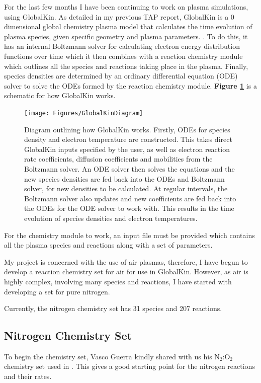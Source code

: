 \documentclass[11pt, oneside]{article}   	%
\begin{document}
For the last few months I have been continuing to work on plasma simulations, using GlobalKin.
As detailed in my previous TAP report, GlobalKin is a 0 dimensional global chemistry plasma model that calculates the time evolution of plasma species, given specific geometry and plasma parameters. \cite{Stafford2004O2}.
To do this, it has an internal Boltzmann solver for calculating electron energy distribution functions over time which it then combines with a reaction chemistry module which outlines all the species and reactions taking place in the plasma.
Finally, species densities are determined by an ordinary differential equation (ODE) solver to solve the ODEs formed by the reaction chemistry module.
\textbf{Figure \ref{fig:GlobalKin}} is a schematic for how GlobalKin works.

\begin{figure}
\texttt{[image: Figures/GlobalKinDiagram]}
\caption{Diagram outlining how GlobalKin works. Firstly, ODEs for species density and electron temperature are constructed. This takes direct GlobalKin inputs specified by the user, as well as electron reaction rate coefficients, diffusion coefficients and mobilities from the Boltzmann solver. An ODE solver then solves the equations and the new species densities are fed back into the ODEs and Boltzmann solver, for new densities to be calculated. At regular intervals, the Boltzmann solver also updates and new coefficients are fed back into the ODEs for the ODE solver to work with. This results in the time evolution of species densities and electron temperatures.}
\label{fig:GlobalKin}
\end{figure}

For the chemistry module to work, an input file must be provided which contains all the plasma species and reactions along with a set of parameters.

My project is concerned with the use of air plasmas, therefore, I have begun to develop a reaction chemistry set for air for use in GlobalKin.
However, as air is highly complex, involving many species and reactions, I have started with developing a set for pure nitrogen.

Currently, the nitrogen chemistry set has 31 species and 207 reactions.


\subsection{Nitrogen Chemistry Set}
To begin the chemistry set, Vasco Guerra kindly shared with us his N$_2$:O$_2$ chemistry set used in \cite{Kutasi2016tuning}.
This gives a good starting point for the nitrogen reactions and their rates.
\end{document}
